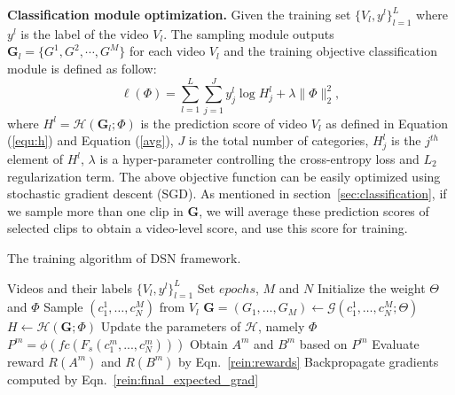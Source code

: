 \documentclass[journal]{IEEEtran}
\begin{document}
{\bf Classification module optimization.} Given the training set $\{V_l, y^l\}_{l=1}^L$ where $y^l$ is the label of the video $V_l$.
The sampling module outputs $\mathbf{G}_l=\{G^1, G^2, \cdots, G^M\}$ for each video $V_l$ and the training objective classification module is defined as follow:
\begin{equation}
\ell(\Phi) = \sum_{l=1}^L \sum_{j=1}^J y_{j}^l \log H^l_j+ \lambda \| \Phi\|^2_2,
\end{equation}
where $H^l=\mathcal{H}(\mathbf{G}_l; \Phi)$ is the prediction score of video $V_l$ as defined in Equation (\ref{equ:h}) and Equation (\ref{avg}), $J$ is the total number of categories, $H^l_j$ is the $j^{th}$ element of $H^l$, $\lambda$ is a hyper-parameter controlling the cross-entropy loss and $L_2$ regularization term.
The above objective function can be easily optimized using stochastic gradient descent (SGD).
As mentioned in section~\ref{sec:classification}, if we sample more than one clip in $\mathbf{G}$, we will average these prediction scores of selected clips to obtain a video-level score, and use this score for training.

\renewcommand{\algorithmicrequire}{\textbf{Input:}}
\begin{algorithm}[t]
        \caption{The training algorithm of DSN framework.}
        \begin{algorithmic}[1]
        \Require Videos and their labels $\{V_l, y^l\}_{l=1}^L$
            \State Set $epochs$, $M$ and $N$
            \State Initialize the weight $\Theta$ and $\Phi$
                \State Sample $(c_1^1,\dots,c_N^M)$ from $V_l$
                    \State $\mathbf{G}=(G_1,\dots,G_M) \leftarrow\mathcal{G}(c_1^1,\dots,c_N^M;\Theta)$
                    \State $H \leftarrow {\mathcal{H}(\mathbf{G};\Phi)}$
                    \State Update the parameters of $\mathcal{H}$, namely $\Phi$
                \EndIf
                    \State $P^m = \phi (fc(F_s(c^m_1,...,c^m_N)))$
                    \State Obtain $A^m$ and $B^m$ based on $P^m$
                    \State Evaluate reward $R(A^m)$ and $R(B^m)$ by Eqn.~\ref{rein:rewards}
                    \State Backpropagate gradients computed by Eqn.~\ref{rein:final_expected_grad}
                \EndFor
            \EndFor
        \end{algorithmic}
\label{alg:procedure}
\end{algorithm}
\end{document}
